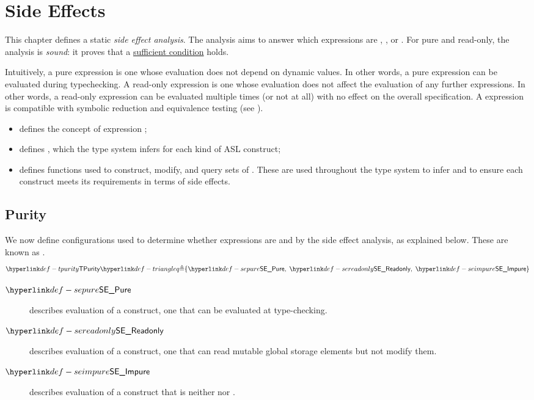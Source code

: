 \chapter{Side Effects\label{chap:SideEffects}}

This chapter defines a static \emph{side effect analysis}.
The analysis aims to answer which expressions are \pure{}, \readonly{}, or \symbolicallyevaluable{}.
For pure and read-only, the analysis is \emph{sound}: it proves that a \underline{sufficient condition} holds.

Intuitively, a pure expression is one whose evaluation does not depend on dynamic values.
In other words, a pure expression can be evaluated during typechecking.
A read-only expression is one whose evaluation does not affect the evaluation of any further expressions.
In other words, a read-only expression can be evaluated multiple times (or not at all) with no effect on the overall specification.
A \symbolicallyevaluable{} expression is compatible with symbolic reduction and equivalence testing (see ).

\ChapterOutline
\begin{itemize}
  \item {} defines the concept of expression \purities{};
  \item {} defines \sideeffectdescriptorsetsterm, which the type system infers
        for each kind of ASL construct;
  \item {} defines functions used to construct, modify, and query sets
        of \sideeffectdescriptorsetsterm{}.
        These are used throughout the type system to infer \sideeffectdescriptorsetsterm{}
        and to ensure each construct meets its requirements in terms of side effects.
\end{itemize}

\section{Purity\label{sec:Purity}}

We now define configurations used to determine whether expressions are \pure{} and \readonly{} by the side effect analysis, as explained below.
These are known as \purities{}.
\hypertarget{def-tpurity}{}
\hypertarget{def-sepure}{}
\hypertarget{def-sereadonly}{}
\hypertarget{def-seimpure}{}
\[
\TPurity \triangleq \{ \SEPure,\; \SEReadonly,\; \SEImpure \}
\]
\begin{description}
    \item[$\SEPure$] describes evaluation of a \pure{} construct, one that can be evaluated at type-checking.
    \item[$\SEReadonly$] describes evaluation of a \readonly{} construct, one that can read mutable global storage elements but not modify them.
    \item[$\SEImpure$] describes evaluation of a construct that is neither \pure{} nor \readonly{}.
\end{description}

